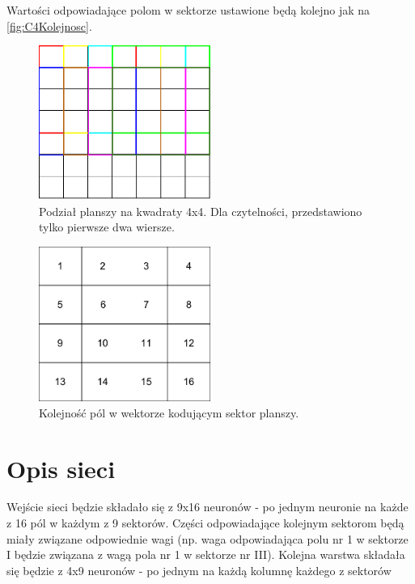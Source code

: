 \documentclass{llncs}
\begin{document}
Wartości odpowiadające polom w sektorze ustawione będą kolejno jak na \autoref{fig:C4Kolejnosc}. 

\begin{figure}
	\centering	
	\includegraphics[width=0.5\textwidth]{img/ConnectFour4x4.pdf}
	\caption{Podział planszy na kwadraty 4x4. Dla czytelności, przedstawiono tylko pierwsze dwa wiersze.}
	\label{fig:C4Podzial}
\end{figure}

\begin{figure}
	\centering	
	\includegraphics[width=0.5\textwidth]{img/ConnectFourOrder.pdf}	\caption{Kolejność pól w wektorze kodującym sektor planszy.}
	\label{fig:C4Kolejnosc}
\end{figure}

\section{Opis sieci}
Wejście sieci będzie składało się z 9x16 neuronów - po jednym neuronie na każde z 16 pól w każdym z 9 sektorów. Części odpowiadające kolejnym sektorom będą miały związane odpowiednie wagi (np. waga odpowiadająca polu nr 1 w sektorze I będzie związana z wagą pola nr 1 w sektorze nr III). Kolejna warstwa składała się będzie z 4x9 neuronów - po jednym na każdą kolumnę każdego z sektorów
\end{document}
